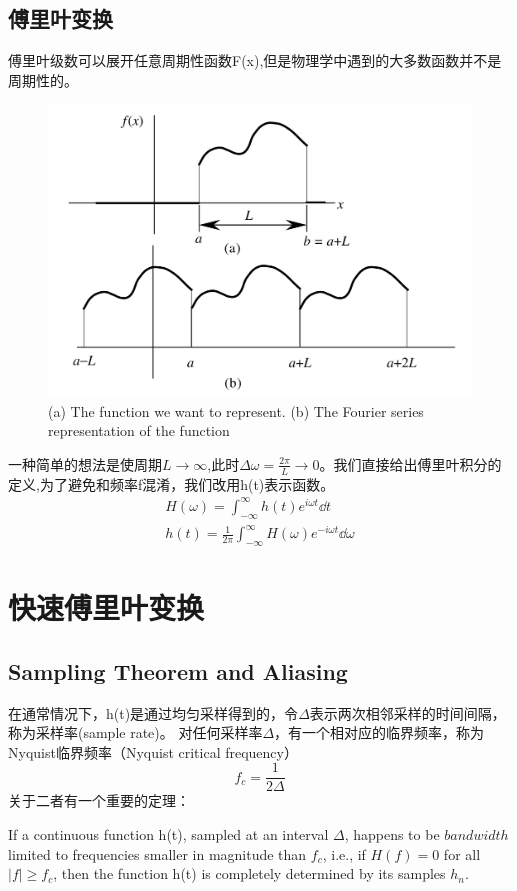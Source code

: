 \subsection{傅里叶变换}
傅里叶级数可以展开任意周期性函数F(x),但是物理学中遇到的大多数函数并不是周期性的。
\begin{figure}
    \includegraphics[width=\linewidth]{figures/FFT0}
    \caption{(a) The function we want to represent. (b) The Fourier series representation of
    the function}
\end{figure}
一种简单的想法是使周期$L\rightarrow \infty$,此时$\Delta\omega=\frac{2\pi}{L}\rightarrow 0$。\cite{MP}我们直接给出傅里叶积分的定义,为了避免和频率f混淆，我们改用h(t)表示函数。
\begin{align}
    H(\omega)=\int_{-\infty}^{\infty} h(t)e^{i\omega t}\dd{t}\\
    h(t)=\frac{1}{2\pi}\int_{-\infty}^{\infty}H(\omega)e^{-i\omega t}\dd{\omega}
\end{align}
\section{快速傅里叶变换}
\subsection{Sampling Theorem and Aliasing}
在通常情况下，h(t)是通过均匀采样得到的，令$\Delta$表示两次相邻采样的时间间隔，称为采样率(sample rate)。
对任何采样率$\Delta$，有一个相对应的临界频率，称为Nyquist临界频率（Nyquist critical frequency）\cite{Numerical}
\begin{equation}
    f_c=\frac{1}{2\Delta}
\end{equation}
关于二者有一个重要的定理：
\begin{tauenv}[frametitle=sampling theorem]
    If a continuous function h(t), sampled at an
interval $\Delta$, happens to be $bandwidth$ limited to frequencies smaller in magnitude than
$f_c$, i.e., if $H(f) = 0$ for all $|f| \geq  f_c$, then the function h(t) is completely determined
by its samples $h_n$.
\end{tauenv}
